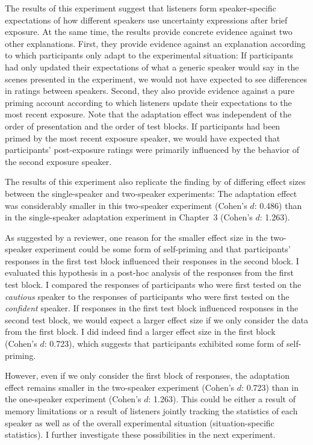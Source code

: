 The results of this experiment suggest that listeners form speaker-specific expectations 
of how different speakers use uncertainty expressions after brief exposure. At the same time, the results provide
concrete evidence against two other explanations. First, they provide evidence against an explanation
according to which participants only adapt to the experimental situation: If participants had only updated 
their expectations of what a generic speaker would say in the scenes presented
in the experiment, we would not have expected to see differences in ratings between speakers. Second, they also 
provide evidence against a pure priming account according to which listeners update their expectations to the most 
recent exposure. Note that the adaptation effect was independent of the order of presentation 
and the order of test blocks. If participants had been primed by the most recent exposure speaker, we would have
expected that participants' post-exposure ratings were primarily influenced by the behavior of the second exposure speaker.


The results of this experiment also replicate the 
finding by \cite{Yildirim2016} of differing effect sizes between the single-speaker and
two-speaker experiments: The adaptation effect
was considerably smaller in this two-speaker experiment (Cohen's $d$: 0.486) than in 
the single-speaker adaptation experiment in Chapter~3 (Cohen's $d$: 1.263). 

As suggested by a reviewer, one reason for the smaller effect size in the two-speaker
experiment could be some form of self-priming and that participants' responses in the first 
test block influenced their responses in the second block. I evaluated this hypothesis
in a post-hoc analysis of the responses from the first test block. I 
compared the responses of participants who were first
tested on the \textit{cautious} speaker to the responses of participants who were first tested 
on the \textit{confident} speaker. If responses in the first test block influenced responses in 
the second test block, we would expect a larger effect size if we only consider the data
from the first block. I did indeed find a larger effect size in the first block (Cohen's $d$: 0.723), which
suggests that participants exhibited some form of self-priming.


However, even if we only consider the first block of responses, the adaptation effect 
remains smaller in the two-speaker experiment (Cohen's $d$: 0.723) than in the
one-speaker experiment (Cohen's $d$: 1.263). This could be either a result of memory limitations 
or a result of listeners jointly tracking the statistics of each speaker
as well as of the overall experimental situation (situation-specific statistics).
I further investigate these possibilities in the next experiment.


